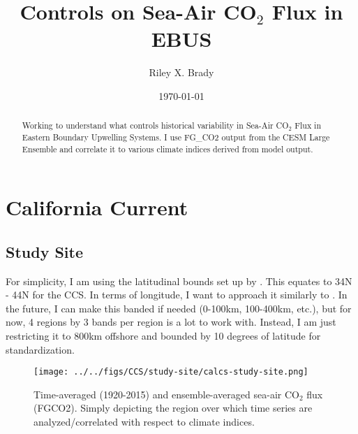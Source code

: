 \documentclass[]{article}
\title{Controls on Sea-Air CO$_{2}$ Flux in EBUS}
\author{Riley X. Brady}
\date{\today}
\begin{document}
\maketitle
\begin{abstract}
\noindent Working to understand what controls historical variability in Sea-Air CO$_{2}$ Flux in Eastern Boundary Upwelling Systems. I use FG\_CO2 output from the CESM Large Ensemble and correlate it to various climate indices derived from model output.
\end{abstract}

\section{California Current}

\subsection{Study Site}
For simplicity, I am using the latitudinal bounds set up by \citet{Chavez:2009}. This equates to 34N - 44N for the CCS. In terms of longitude, I want to approach it similarly to \citet{Turi:2014}. In the future, I can make this banded if needed (0-100km, 100-400km, etc.), but for now, 4 regions by 3 bands per region is a lot to work with. Instead, I am just restricting it to 800km offshore and bounded by 10 degrees of latitude for standardization.

\begin{figure}[!h]
	\centering
	\texttt{[image: ../../figs/CCS/study-site/calcs-study-site.png]}
	\caption{Time-averaged (1920-2015) and ensemble-averaged sea-air CO$_{2}$ flux (FGCO2). Simply depicting the region over which time series are analyzed/correlated with respect to climate indices.}
\end{figure}



\end{document}

